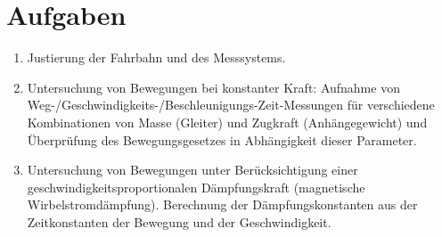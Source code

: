 \documentclass[a4paper,german,12pt,smallheadings]{scrartcl}
\begin{document}
\section*{Aufgaben}
\begin{enumerate}[1.]
  \item
    Justierung der Fahrbahn und des Messsystems.
  \item
    Untersuchung von Bewegungen bei konstanter Kraft: Aufnahme von
    Weg-/Geschwindigkeits-/Beschleunigungs-Zeit-Messungen für verschiedene
    Kombinationen von Masse (Gleiter) und Zugkraft (Anhängegewicht) und
    Überprüfung des Bewegungsgesetzes in Abhängigkeit dieser Parameter.
  \item
    Untersuchung von Bewegungen unter Berücksichtigung einer
    geschwindigkeitsproportionalen Dämpfungskraft (magnetische
    Wirbelstromdämpfung). Berechnung der Dämpfungskonstanten aus der
    Zeitkonstanten der Bewegung und der Geschwindigkeit.
\end{enumerate}
\end{document}
